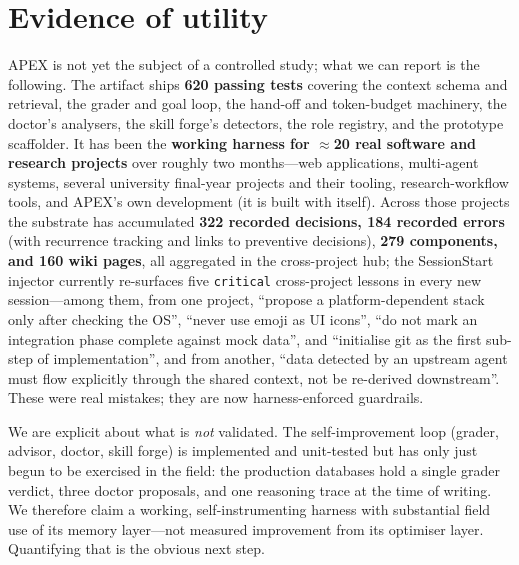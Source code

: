 \documentclass[sigconf,review,anonymous=false]{acmart}
\begin{document}
\section{Evidence of utility}
APEX is not yet the subject of a controlled study; what we can report is the
following. The artifact ships \textbf{620 passing tests} covering the context
schema and retrieval, the grader and goal loop, the hand-off and token-budget
machinery, the doctor's analysers, the skill forge's detectors, the role registry,
and the prototype scaffolder. It has been the \textbf{working harness for
\(\approx\)20 real software and research projects} over roughly two months---web
applications, multi-agent systems, several university final-year projects and their
tooling, research-workflow tools, and APEX's own development (it is built with
itself). Across those projects the substrate has accumulated \textbf{322 recorded
decisions, 184 recorded errors} (with recurrence tracking and links to preventive
decisions), \textbf{279 components, and 160 wiki pages}, all aggregated in the
cross-project hub; the \textsf{SessionStart} injector currently re-surfaces five
\texttt{critical} cross-project lessons in every new session---among them, from one
project, ``propose a platform-dependent stack only after checking the OS'', ``never
use emoji as UI icons'', ``do not mark an integration phase complete against mock
data'', and ``initialise git as the first sub-step of implementation'', and from
another, ``data detected by an upstream agent must flow explicitly through the
shared context, not be re-derived downstream''. These were real mistakes; they are
now harness-enforced guardrails.

We are explicit about what is \emph{not} validated. The self-improvement loop
(grader, advisor, doctor, skill forge) is implemented and unit-tested but has only
just begun to be exercised in the field: the production databases hold a single
grader verdict, three doctor proposals, and one reasoning trace at the time of
writing. We therefore claim a working, self-instrumenting harness with substantial
field use of its memory layer---not measured improvement from its optimiser layer.
Quantifying that is the obvious next step.

\end{document}

